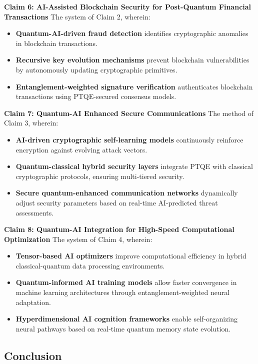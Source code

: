 \documentclass{article}
\theoremstyle{plain}
\begin{document}
\noindent \textbf{Claim 6: AI-Assisted Blockchain Security for Post-Quantum Financial Transactions}  
The system of Claim 2, wherein:

\begin{itemize}
    \item \textbf{Quantum-AI-driven fraud detection} identifies cryptographic anomalies in blockchain transactions.
    \item \textbf{Recursive key evolution mechanisms} prevent blockchain vulnerabilities by autonomously updating cryptographic primitives.
    \item \textbf{Entanglement-weighted signature verification} authenticates blockchain transactions using PTQE-secured consensus models.
\end{itemize}

\noindent \textbf{Claim 7: Quantum-AI Enhanced Secure Communications}  
The method of Claim 3, wherein:

\begin{itemize}
    \item \textbf{AI-driven cryptographic self-learning models} continuously reinforce encryption against evolving attack vectors.
    \item \textbf{Quantum-classical hybrid security layers} integrate PTQE with classical cryptographic protocols, ensuring multi-tiered security.
    \item \textbf{Secure quantum-enhanced communication networks} dynamically adjust security parameters based on real-time AI-predicted threat assessments.
\end{itemize}

\noindent \textbf{Claim 8: Quantum-AI Integration for High-Speed Computational Optimization}  
The system of Claim 4, wherein:

\begin{itemize}
    \item \textbf{Tensor-based AI optimizers} improve computational efficiency in hybrid classical-quantum data processing environments.
    \item \textbf{Quantum-informed AI training models} allow faster convergence in machine learning architectures through entanglement-weighted neural adaptation.
    \item \textbf{Hyperdimensional AI cognition frameworks} enable self-organizing neural pathways based on real-time quantum memory state evolution.
\end{itemize}

\subsection{Conclusion}
\end{document}
